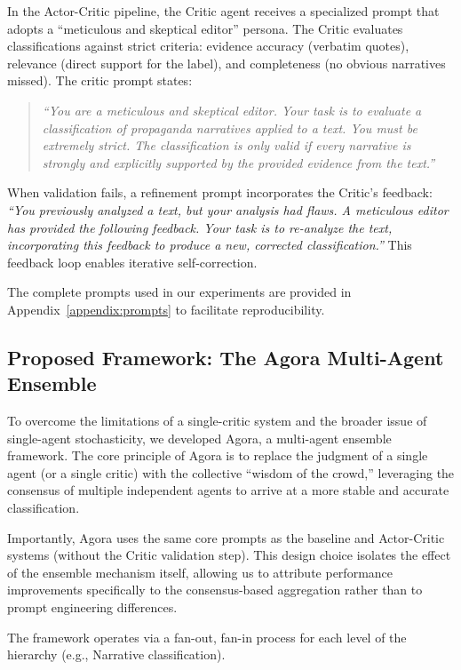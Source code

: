 In the Actor-Critic pipeline, the Critic agent receives a specialized prompt that adopts a ``meticulous and skeptical editor'' persona. The Critic evaluates classifications against strict criteria: evidence accuracy (verbatim quotes), relevance (direct support for the label), and completeness (no obvious narratives missed). The critic prompt states:

\begin{quote}
\textit{``You are a meticulous and skeptical editor. Your task is to evaluate a classification of propaganda narratives applied to a text. You must be extremely strict. The classification is only valid if every narrative is strongly and explicitly supported by the provided evidence from the text.''}
\end{quote}

\noindent When validation fails, a refinement prompt incorporates the Critic's feedback: \textit{``You previously analyzed a text, but your analysis had flaws. A meticulous editor has provided the following feedback. Your task is to re-analyze the text, incorporating this feedback to produce a new, corrected classification.''} This feedback loop enables iterative self-correction.

The complete prompts used in our experiments are provided in Appendix~\ref{appendix:prompts} to facilitate reproducibility.

\subsection{Proposed Framework: The Agora Multi-Agent Ensemble}

To overcome the limitations of a single-critic system and the broader issue of single-agent stochasticity, we developed Agora, a multi-agent ensemble framework. The core principle of Agora is to replace the judgment of a single agent (or a single critic) with the collective ``wisdom of the crowd,'' leveraging the consensus of multiple independent agents to arrive at a more stable and accurate classification.

Importantly, Agora uses the same core prompts as the baseline and Actor-Critic systems (without the Critic validation step). This design choice isolates the effect of the ensemble mechanism itself, allowing us to attribute performance improvements specifically to the consensus-based aggregation rather than to prompt engineering differences.

The framework operates via a fan-out, fan-in process for each level of the hierarchy (e.g., Narrative classification).

